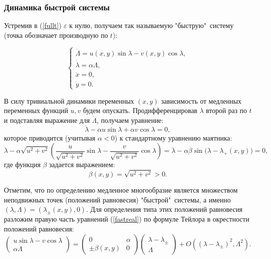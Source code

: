 \subsubsection{Динамика быстрой системы}
Устремив в (\ref{fullt}) $\varepsilon$ к нулю, получаем так называемую "быструю"\, систему (точка обозначает производную по $t$):

\begin{equation}
    \begin{cases}
        \dot \Lambda = u(x,y) \sin \lambda - v(x,y) \cos \lambda, \\
        \dot \lambda = \alpha \Lambda, \\
        \dot x = 0, \\
        \dot y = 0.
    \end{cases}
    \label{fastreal}
\end{equation}

В силу тривиальной динамики переменных $(x, y)$ зависимость от медленных переменных функций $u, v$ будем опускать. Продифференцировав $\lambda$ второй раз по $t$ и подставляя выражение для $\dot \Lambda$, получаем уравнение:
$$\ddot \lambda - \alpha u \sin \lambda + \alpha v \cos \lambda = 0,$$
которое приводится (учитывая $\alpha < 0$) к стандартному уравнению маятника:
$$\ddot \lambda - \alpha \sqrt{u^2+v^2} \left( \frac{u}{\sqrt{u^2+v^2}}\sin \lambda - \frac{v}{\sqrt{u^2+v^2}}\cos \lambda \right) = \ddot \lambda - \alpha \beta \sin \big( \lambda - \lambda_{+}(x,y) \big) = 0,$$
где функция $\beta$ задается выражением:
$$\beta(x,y) = \sqrt{u^2+v^2} > 0.$$

Отметим, что по определению медленное многообразие является множеством неподвижных точек (положений равновесия) "быстрой"\, системы, а именно 
$(\lambda, \Lambda)  = (\lambda_{\pm}(x,y), 0)$. Для определения типа этих положений равновесия разложим правую часть уравнений (\ref{fastreal}) по формуле Тейлора в окрестности положений равновесия:
$$\begin{pmatrix}
  u \sin \lambda - v \cos \lambda \\
  \alpha \Lambda
 \end{pmatrix}
 =
 \begin{pmatrix}
  0 & \alpha \\
  \pm \beta(x,y) & 0
 \end{pmatrix}
 \begin{pmatrix}
  \lambda - \lambda_{\pm}\\
  \Lambda
 \end{pmatrix} + O((\lambda - \lambda_{\pm})^2, \Lambda^2).
$$

